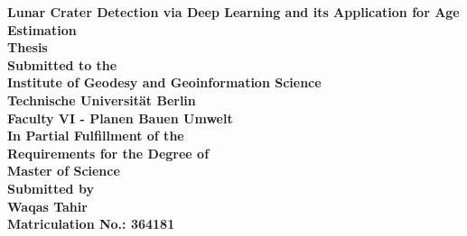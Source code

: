 \documentclass[11pt]{article}
\begin{document}
\sloppy

\begin{titlepage}

	

	\begin{center}
		\textbf{\LARGE{ Lunar Crater Detection via Deep Learning and its Application for Age Estimation \\[1.2 cm]}}
		\vspace{1.4cm}
		\textbf{\large Thesis}\\
		\vspace{0.2cm}
		\textbf{\large Submitted to the}\\
		\vspace{0.2cm}
		\textbf{\large Institute of Geodesy and Geoinformation Science}\\
	    \vspace{0.2cm}
	    \textbf {\large Technische Universit\"{a}t Berlin}\\
	    \vspace{0.2cm}
	    \textbf{\large Faculty VI - Planen Bauen Umwelt}\\
	    	    \vspace{0.8cm}
	    \textbf{\large In Partial Fulfillment of the}\\
	    	    	    \vspace{0.2 cm}
	    \textbf{\large Requirements for the Degree of}\\
	    	    	    \vspace{1 cm}
	    \textbf{\Large{Master of Science}}\\
	    	    	    	    \vspace{2.4 cm}
	    \textbf{Submitted by}\\
	    	    \vspace{0.2 cm}
	    	   \textbf{Waqas Tahir}\\
	    \vspace{0.2 cm}
	    \textbf{Matriculation No.: 364181}\\
	    

\end{center}
\end{titlepage}
\end{document}
